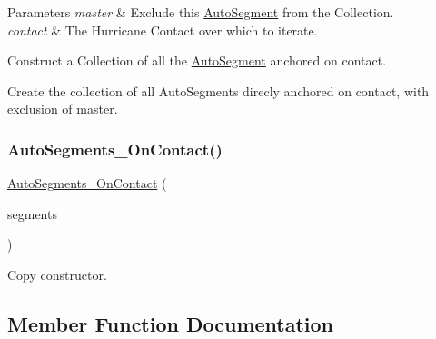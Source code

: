\begin{DoxyParams}{Parameters}
{\em master} & Exclude this \mbox{\hyperlink{classKatabatic_1_1AutoSegment}{Auto\+Segment}} from the Collection. \\
\hline
{\em contact} & The Hurricane Contact over which to iterate.\\
\hline
\end{DoxyParams}
Construct a Collection of all the \mbox{\hyperlink{classKatabatic_1_1AutoSegment}{Auto\+Segment}} anchored on {\ttfamily contact}.

Create the collection of all Auto\+Segments direcly anchored on {\ttfamily contact}, with exclusion of {\ttfamily master}. \mbox{\label{classKatabatic_1_1AutoSegments__OnContact_ab6ff1773c5335fe496f61f2703a5ac99}} 
\subsubsection{\texorpdfstring{Auto\+Segments\+\_\+\+On\+Contact()}{AutoSegments\_OnContact()}\hspace{0.1cm}{\footnotesize\ttfamily [2/2]}}
{\footnotesize\ttfamily \mbox{\hyperlink{classKatabatic_1_1AutoSegments__OnContact}{Auto\+Segments\+\_\+\+On\+Contact}} (\begin{DoxyParamCaption}\item[{const \mbox{\hyperlink{classKatabatic_1_1AutoSegments__OnContact}{Auto\+Segments\+\_\+\+On\+Contact}} \&}]{segments }\end{DoxyParamCaption})\hspace{0.3cm}{\ttfamily [inline]}}

Copy constructor. 

\subsection{Member Function Documentation}
\mbox{\label{classKatabatic_1_1AutoSegments__OnContact_a5b26b0698bdcb40cbf51b250dfb21858}} 
